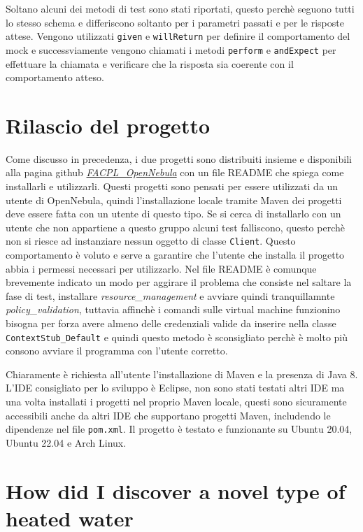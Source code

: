 Soltano alcuni dei metodi di test sono stati riportati, questo perchè seguono tutti lo stesso schema e differiscono soltanto per i parametri passati e per le risposte attese. Vengono utilizzati \texttt{given} e \texttt{willReturn} per definire il comportamento del mock e successviamente vengono chiamati i metodi \texttt{perform} e \texttt{andExpect} per effettuare la chiamata e verificare che la risposta sia coerente con il comportamento atteso.

\section{Rilascio del progetto}
Come discusso in precedenza, i due progetti sono distribuiti insieme e disponibili alla pagina github \href{https://github.com/alienix2/FACPL_Opennebula_thesis}{\emph{FACPL\_OpenNebula}} con un file README che spiega come installarli e utilizzarli. Questi progetti sono pensati per essere utilizzati da un utente di OpenNebula, quindi l'installazione locale tramite Maven dei progetti deve essere fatta con un utente di questo tipo. Se si cerca di installarlo con un utente che non appartiene a questo gruppo alcuni test falliscono, questo perchè non si riesce ad instanziare nessun oggetto di classe \texttt{Client}. Questo comportamento è voluto e serve a garantire che l'utente che installa il progetto abbia i permessi necessari per utilizzarlo. Nel file README è comunque brevemente indicato un modo per aggirare il problema che consiste nel saltare la fase di test, installare \emph{resource\_management} e avviare quindi tranquillamnte \emph{policy\_validation}, tuttavia affinchè i comandi sulle virtual machine funzionino bisogna per forza avere almeno delle credenziali valide da inserire nella classe \texttt{ContextStub\_Default} e quindi questo metodo è sconsigliato perchè è molto più consono avviare il programma con l'utente corretto.\par
Chiaramente è richiesta all'utente l'installazione di Maven e la presenza di Java 8. L'IDE consigliato per lo sviluppo è Eclipse, non sono stati testati altri IDE ma una volta installati i progetti nel proprio Maven locale, questi sono sicuramente accessibili anche da altri IDE che supportano progetti Maven, includendo le dipendenze nel file \texttt{pom.xml}. Il progetto è testato e funzionante su Ubuntu 20.04, Ubuntu 22.04 e Arch Linux.


\newpage
\section{How did I discover a novel type of heated water}

